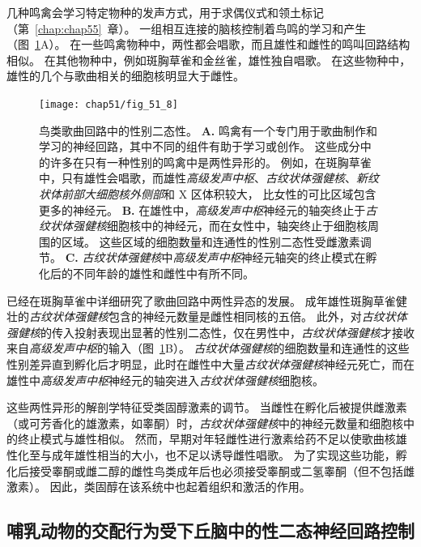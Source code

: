 几种鸣禽会学习特定物种的发声方式，用于求偶仪式和领土标记（第~\ref{chap:chap55}~章）。
一组相互连接的脑核控制着鸟鸣的学习和产生（图~\ref{fig:51_8}A）。
在一些鸣禽物种中，两性都会唱歌，而且雄性和雌性的鸣叫回路结构相似。
在其他物种中，例如斑胸草雀和金丝雀，雄性独自唱歌。
在这些物种中，雄性的几个与歌曲相关的细胞核明显大于雌性。


\begin{figure}[htbp]
	\centering
	\texttt{[image: chap51/fig\_51\_8]}
	\caption{鸟类歌曲回路中的性别二态性。
		\textbf{A.} 鸣禽有一个专门用于歌曲制作和学习的神经回路，其中不同的组件有助于学习或创作。
		这些成分中的许多在只有一种性别的鸣禽中是两性异形的。
		例如，在斑胸草雀中，只有雄性会唱歌，而雄性\textit{高级发声中枢}、\textit{古纹状体强健核}、\textit{新纹状体前部大细胞核外侧部}和 X 区体积较大， 比女性的可比区域包含更多的神经元\cite{brainard2002songbirds}。
		\textbf{B.} 在雄性中，\textit{高级发声中枢}神经元的轴突终止于\textit{古纹状体强健核}细胞核中的神经元，而在女性中，轴突终止于细胞核周围的区域。
		这些区域的细胞数量和连通性的性别二态性受雌激素调节\cite{morris2004sexual}。
		\textbf{C.} \textit{古纹状体强健核}中\textit{高级发声中枢}神经元轴突的终止模式在孵化后的不同年龄的雄性和雌性中有所不同\cite{konishi1985neuronal}。 }
	\label{fig:51_8}
\end{figure}


已经在斑胸草雀中详细研究了歌曲回路中两性异态的发展。
成年雄性斑胸草雀健壮的\textit{古纹状体强健核}包含的神经元数量是雌性相同核的五倍。
此外，对\textit{古纹状体强健核}的传入投射表现出显著的性别二态性，仅在男性中，\textit{古纹状体强健核}才接收来自\textit{高级发声中枢}的输入（图~\ref{fig:51_8}B）。
\textit{古纹状体强健核}的细胞数量和连通性的这些性别差异直到孵化后才明显，此时在雌性中大量\textit{古纹状体强健核}神经元死亡，而在雄性中\textit{高级发声中枢}神经元的轴突进入\textit{古纹状体强健核}细胞核。


这些两性异形的解剖学特征受类固醇激素的调节。
当雌性在孵化后被提供雌激素（或可芳香化的雄激素，如睾酮）时，\textit{古纹状体强健核}中的神经元数量和细胞核中的终止模式与雄性相似。
然而，早期对年轻雌性进行激素给药不足以使歌曲核雄性化至与成年雄性相当的大小，也不足以诱导雌性唱歌。
为了实现这些功能，孵化后接受睾酮或雌二醇的雌性鸟类成年后也必须接受睾酮或二氢睾酮（但不包括雌激素）。
因此，类固醇在该系统中也起着组织和激活的作用。



\subsection{哺乳动物的交配行为受下丘脑中的性二态神经回路控制}

